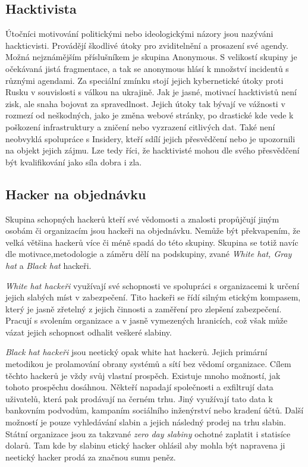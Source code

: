 \subsection{Hacktivista}\label{subsec:hacktivista}
Útočníci motivování politickými nebo ideologickými názory jsou nazýváni hackticvisti.
Provádějí škodlivé útoky pro zviditelnění a prosazení své agendy.
Možná nejznámějším příslušníkem je skupina Anonymous.
S velikostí skupiny je očekávaná jistá fragmentace, a tak se anonymous hlásí k množství incidentů s různými agendami.
Za speciální zmínku stojí jejich kybernetické útoky proti Rusku v souvislosti s válkou na ukrajině\cite{anonymous_russian_attacks}.
Jak je jasné, motivací hacktivistů není zisk, ale snaha bojovat za spravedlnost.
Jejich útoky tak bývají ve vážnosti v rozmezí od neškodných, jako je změna webové stránky, po drastické kde vede k poškození infrastruktury a zničení nebo vyzrazení citlivých dat.
Také není neobvyklá spolupráce s Insidery, kteří sdílí jejich přesvědčení nebo je upozornili na objekt jejich zájmu.
Lze tedy říci, že hacktivisté mohou dle svého přesvědčení být kvalifikování jako síla dobra i zla.


\subsection{Hacker na objednávku}
Skupina schopných hackerů kteří své vědomosti a znalosti propůjčují jiným osobám či organizacím jsou hackeři na objednávku.
Nemůže být překvapením, že velká většina hackerů více či méně spadá do této skupiny.
Skupina se totiž navíc dle motivace,metodologie a záměru dělí na podskupiny, zvané \textit{White hat, Gray hat} a \textit{Black hat} hackeři.

\textit{White hat hackeři} využívají své schopnosti ve spolupráci s organizacemi k určení jejich slabých míst v zabezpečení.
Tito hackeři se řídí silným etickým kompasem, který je jasně zřetelný z jejich činnosti a zaměření pro zlepšení zabezpečení.
Pracují s svolením organizace a v jasně vymezených hranicích, což však může vázat jejich schopnost odhalit veškeré slabiny.

\textit{Black hat hackeři} jsou neetický opak white hat hackerů.
Jejich primární metodikou je prolamování obrany systémů a sítí bez vědomí organizace.
Cílem těchto hackerů je vždy svůj vlastní prospěch.
Existuje mnoho možností, jak tohoto prospěchu dosáhnou.
Někteří napadají společnosti a exfiltrují data uživatelů, která pak prodávají na černém trhu.
Jiný využívají tato data k bankovním podvodům, kampaním sociálního inženýrství nebo kradení účtů.
Další možností je pouze vyhledávání slabin a jejich následný prodej na trhu slabin.
Státní organizace jsou za takzvané \textit{zero day slabiny} ochotné zaplatit i statisíce dolarů\cite{world_end_2021}.
Tam kde by slabinu etický hacker ohlásil aby mohla být napravena ji neetický hacker prodá za značnou sumu peněz.


